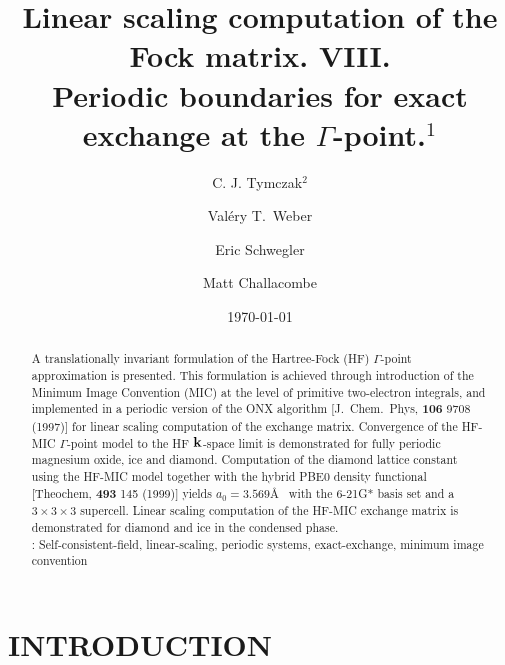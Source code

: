 \documentclass[prb,aps,nobibnotes,twocolumn,doublespace,twocolumngrid,superbib,showpacs]{revtex4}
\begin{document}
\title{Linear scaling computation of the Fock matrix.  VIII. \\  
       Periodic boundaries for exact exchange at the $\Gamma$-point.$^1$ }

\author{C. J. Tymczak$^2$}
\author{Val{\'e}ry T.~Weber}
\author{Eric Schwegler}
\author{Matt Challacombe}

\date{\today}
\begin{abstract}
A translationally invariant formulation of the Hartree-Fock (HF) $\Gamma$-point approximation
is presented.   This formulation is achieved through introduction of  the  Minimum Image Convention (MIC) at 
the level of primitive two-electron integrals, and implemented in a periodic version of the 
ONX algorithm [J.~Chem.~Phys, {\bf 106} 9708 (1997)] for linear scaling computation of the
exchange matrix. Convergence of the HF-MIC $\Gamma$-point model to the HF ${\bf k}$-space limit 
is demonstrated for fully periodic magnesium oxide, ice and diamond.  Computation of the diamond
lattice constant using the HF-MIC model together with the hybrid PBE0 density functional 
[Theochem, {\bf 493} 145 (1999)] yields $a_0=3.569$\AA~ with the 6-21G* basis set and a 
$3\times3\times3$ supercell.  Linear scaling computation of the HF-MIC exchange matrix is demonstrated 
for diamond and ice in the condensed phase. \\
: Self-consistent-field, linear-scaling, periodic systems, exact-exchange, minimum image convention
\end{abstract}


\maketitle


\section{INTRODUCTION}
\end{document}
